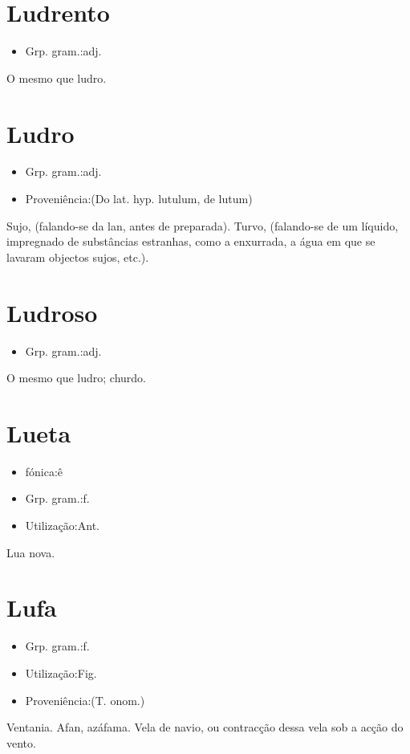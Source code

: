 \section{Ludrento}
\begin{itemize}
\item {Grp. gram.:adj.}
\end{itemize}
O mesmo que \textunderscore ludro\textunderscore .
\section{Ludro}
\begin{itemize}
\item {Grp. gram.:adj.}
\end{itemize}
\begin{itemize}
\item {Proveniência:(Do lat. hyp. \textunderscore lutulum\textunderscore , de \textunderscore lutum\textunderscore )}
\end{itemize}
Sujo, (falando-se da lan, antes de preparada).
Turvo, (falando-se de um líquido, impregnado de substâncias estranhas, como a enxurrada, a água em que se lavaram objectos sujos, etc.).
\section{Ludroso}
\begin{itemize}
\item {Grp. gram.:adj.}
\end{itemize}
O mesmo que \textunderscore ludro\textunderscore ; churdo.
\section{Lueta}
\begin{itemize}
\item {fónica:ê}
\end{itemize}
\begin{itemize}
\item {Grp. gram.:f.}
\end{itemize}
\begin{itemize}
\item {Utilização:Ant.}
\end{itemize}
Lua nova.
\section{Lufa}
\begin{itemize}
\item {Grp. gram.:f.}
\end{itemize}
\begin{itemize}
\item {Utilização:Fig.}
\end{itemize}
\begin{itemize}
\item {Proveniência:(T. onom.)}
\end{itemize}
Ventania.
Afan, azáfama.
Vela de navio, ou contracção dessa vela sob a acção do vento.
